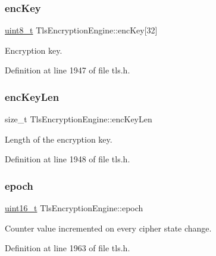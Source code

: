 \subsubsection{\texorpdfstring{enc\+Key}{encKey}}
{\footnotesize\ttfamily \hyperlink{stdint_8h_aba7bc1797add20fe3efdf37ced1182c5}{uint8\+\_\+t} Tls\+Encryption\+Engine\+::enc\+Key\mbox{[}32\mbox{]}}



Encryption key. 



Definition at line 1947 of file tls.\+h.

\mbox{\label{structTlsEncryptionEngine_ad657d271cd7780efcb7d2005737256dd}} 
\subsubsection{\texorpdfstring{enc\+Key\+Len}{encKeyLen}}
{\footnotesize\ttfamily size\+\_\+t Tls\+Encryption\+Engine\+::enc\+Key\+Len}



Length of the encryption key. 



Definition at line 1948 of file tls.\+h.

\mbox{\label{structTlsEncryptionEngine_a7c88a932eb88fccdae6829f18709b1b6}} 
\subsubsection{\texorpdfstring{epoch}{epoch}}
{\footnotesize\ttfamily \hyperlink{stdint_8h_a273cf69d639a59973b6019625df33e30}{uint16\+\_\+t} Tls\+Encryption\+Engine\+::epoch}



Counter value incremented on every cipher state change. 



Definition at line 1963 of file tls.\+h.

\mbox{\label{structTlsEncryptionEngine_a40318ca61231c157990a287f4a9c0e2a}} 
